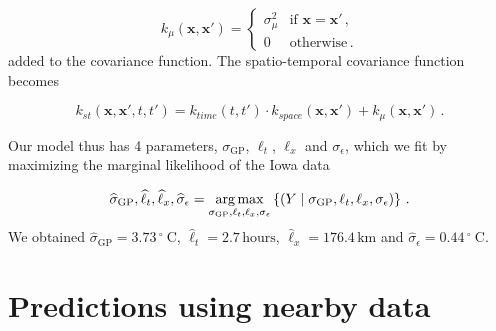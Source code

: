 \documentclass[letter]{article}
\newcommand{\genericdel}[3]{%
      \left#1#3\right#2
    }
\newcommand{\del}[1]{\genericdel(){#1}}
\newcommand{\cbr}[1]{\genericdel\{\}{#1}}
\DeclareMathOperator*{\argmax}{arg\,max}
\let\Pr\relax
\DeclareMathOperator{\Pr}{\mathbb{P}}
\newcommand{\xvec}{\mathbold{x}}
\newcommand{\sigmaf}{\sigma_{\mathrm{GP}}}
\newcommand{\sigman}{\sigma_{\epsilon}}
\newcommand{\degreeC}{{}^{\circ}~\mathrm{C}}
\begin{document}
\begin{equation}
    k_{\mu}(\xvec, \xvec') = \begin{cases}
\sigma_\mu^2 &\text{if } \xvec = \xvec'\,, \\
0 &\text{otherwise}\,.
\end{cases}
\end{equation}
added to the covariance function.
The spatio-temporal covariance function becomes

\begin{equation}
    k_{st}(\xvec,\xvec',t,t') = k_{time}(t,t') \cdot k_{space}(\xvec, \xvec') + k_\mu(\xvec, \xvec') \,.
\end{equation}

Our model thus has 4 parameters, \(\sigmaf\), \(\ell_t\), \(\ell_x\) and \(\sigman\), which we fit by maximizing the marginal likelihood of the Iowa data

\begin{equation}
\label{eq:optimization}
\widehat\sigmaf,\widehat\ell_t,\widehat\ell_x,\widehat\sigman = \argmax_{\sigmaf,\ell_t,\ell_x,\sigman} \cbr{ \Pr\del{ Y \mid {\sigmaf,\ell_t,\ell_x,\sigman} } }\,.
\end{equation}
We obtained \(\widehat\sigmaf=3.73\,\degreeC\), \(\widehat\ell_t=2.7\,\mathrm{hours}\), \(\widehat\ell_x=176.4\,\mathrm{km}\) and \(\widehat\sigman=0.44\,\degreeC\).
    
\section{Predictions using nearby data}\label{predictions-using-nearby-data}
    
\end{document}
